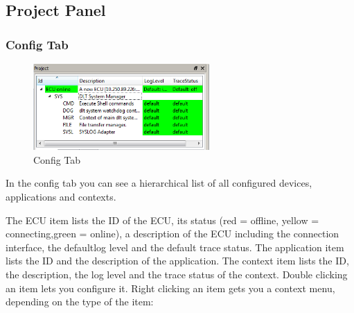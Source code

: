\documentclass[a4paper,11pt]{article}
\begin{document}
\pagebreak

\subsection{Project Panel}

\subsubsection{Config Tab}


\begin{figure}[H]
 \centering
 \includegraphics[width=0.6\textwidth]{images/project_widget.png}
 \caption{Config Tab}
 \label{fig:configtab}
\end{figure}


In the config tab you can see a hierarchical list of all configured devices, applications and contexts.

The ECU item lists the ID of the ECU, its status (red = offline, yellow = connecting,green = online), a description of the ECU including the connection interface, the defaultlog level and the default trace status.\linebreak
The application item lists the ID and the description of the application.\linebreak
The context item lists the ID, the description, the log level and the trace status of the context.
Double clicking an item lets you configure it. Right clicking an item gets you a context menu, depending on the type of the item:\linebreak
\end{document}
